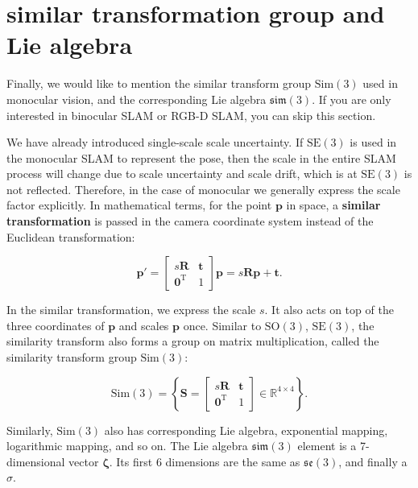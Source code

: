 \section{\textsuperscript{\ttfamily *}similar transformation group and Lie algebra}

Finally, we would like to mention the similar transform group $\mathrm{Sim}(3)$ used in monocular vision, and the corresponding Lie algebra $\mathfrak{sim}(3)$. If you are only interested in binocular SLAM or RGB-D SLAM, you can skip this section.

We have already introduced single-scale scale uncertainty. If $\mathrm{SE}(3)$ is used in the monocular SLAM to represent the pose, then the scale in the entire SLAM process will change due to scale uncertainty and scale drift, which is at $\mathrm{SE}( 3) $ is not reflected. Therefore, in the case of monocular we generally express the scale factor explicitly. In mathematical terms, for the point $\bm{p}$ in space, a \textbf{similar transformation} is passed in the camera coordinate system instead of the Euclidean transformation:

\begin{equation}\label{key}
\bm{p}' = \left[ {\begin{array}{*{20}{c}}
	{s\bm{R}}&\bm{t}\\
	{{\bm{0}^\mathrm{T}}}&1
	\end{array}} \right] \bm{p}
= s\bm{R} \bm{p} + \bm{t}.
\end{equation}

In the similar transformation, we express the scale $s$. It also acts on top of the three coordinates of $\bm{p}$ and scales $\bm{p}$ once. Similar to $\mathrm{SO}(3)$, $\mathrm{SE}(3)$, the similarity transform also forms a group on matrix multiplication, called the similarity transform group $\mathrm{Sim}(3)$:

\begin{equation}\label{key}
\mathrm{Sim}(3) = \left\{ { \bm{S} = \left[ {\begin{array}{*{20}{c}}
		{s\bm{R}}& \bm{t}\\
		{{\bm{0}^\mathrm{T}}}&1
		\end{array}} \right] \in {\mathbb{R}^{4 \times 4}}} \right\}.
\end{equation}

Similarly, $\mathrm{Sim}(3)$ also has corresponding Lie algebra, exponential mapping, logarithmic mapping, and so on. The Lie algebra $\mathfrak{sim}(3)$ element is a 7-dimensional vector $\boldsymbol{\zeta}$. Its first 6 dimensions are the same as $\mathfrak{se}(3)$, and finally a $\sigma$.

